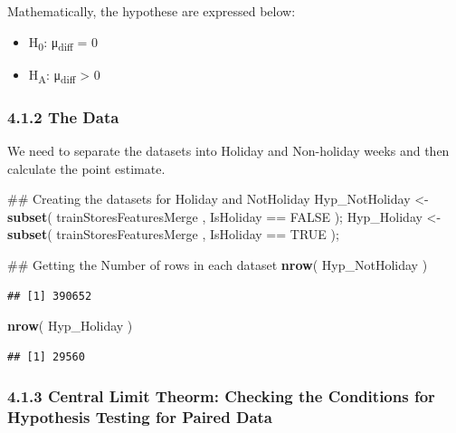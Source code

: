 \documentclass[]{article}
\newenvironment{Shaded}{\begin{snugshade}}{\end{snugshade}}
\newcommand{\KeywordTok}[1]{\textcolor[rgb]{0.13,0.29,0.53}{\textbf{{#1}}}}
\newcommand{\StringTok}[1]{\textcolor[rgb]{0.31,0.60,0.02}{{#1}}}
\newcommand{\OtherTok}[1]{\textcolor[rgb]{0.56,0.35,0.01}{{#1}}}
\newcommand{\NormalTok}[1]{{#1}}
\begin{document}
Mathematically, the hypothese are expressed below:

\begin{itemize}
\itemsep1pt\parskip0pt
\item
  H\textsubscript{0}: μ\textsubscript{diff} = 0
\item
  H\textsubscript{A}: μ\textsubscript{diff} \textgreater{} 0
\end{itemize}

\subsubsection{4.1.2 The Data}\label{the-data}

We need to separate the datasets into Holiday and Non-holiday weeks and
then calculate the point estimate.

\begin{Shaded}
\begin{Highlighting}[]
\NormalTok{## Creating the datasets for Holiday and NotHoliday}
\NormalTok{Hyp_NotHoliday <-}\StringTok{ }\KeywordTok{subset}\NormalTok{( trainStoresFeaturesMerge , IsHoliday ==}\StringTok{ }\OtherTok{FALSE} \NormalTok{);}
\NormalTok{Hyp_Holiday <-}\StringTok{ }\KeywordTok{subset}\NormalTok{( trainStoresFeaturesMerge , IsHoliday ==}\StringTok{ }\OtherTok{TRUE} \NormalTok{);}

\NormalTok{## Getting the Number of rows in each dataset}
\KeywordTok{nrow}\NormalTok{( Hyp_NotHoliday )}
\end{Highlighting}
\end{Shaded}

\begin{verbatim}
## [1] 390652
\end{verbatim}

\begin{Shaded}
\begin{Highlighting}[]
\KeywordTok{nrow}\NormalTok{( Hyp_Holiday )}
\end{Highlighting}
\end{Shaded}

\begin{verbatim}
## [1] 29560
\end{verbatim}

\subsubsection{4.1.3 Central Limit Theorm: Checking the Conditions for
Hypothesis Testing for Paired
Data}\label{central-limit-theorm-checking-the-conditions-for-hypothesis-testing-for-paired-data}
\end{document}
